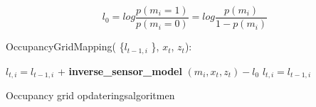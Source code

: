 \[ l_0 =  log \frac{p(m_i = 1)}{p(m_i = 0)} = log \frac{p(m_i)}{1- p(m_i)} \]

\begin{algorithm}[H]
\LinesNumbered
OccupancyGridMapping( \{$ l_{t-1,i} $ \}, $ x_t $, $ z_t $):

{
{ $ l_{t,i} = l_{t-1,i} $ + \textbf{inverse\_sensor\_model} $( m_i, x_t, z_t ) - l_0$\; }
{ $ l_{t,i} = l_{t-1,i}  $\; }
}
\caption{Occupancy grid opdateringsalgoritmen}\label{occupancygrid:alg}
\end{algorithm}




